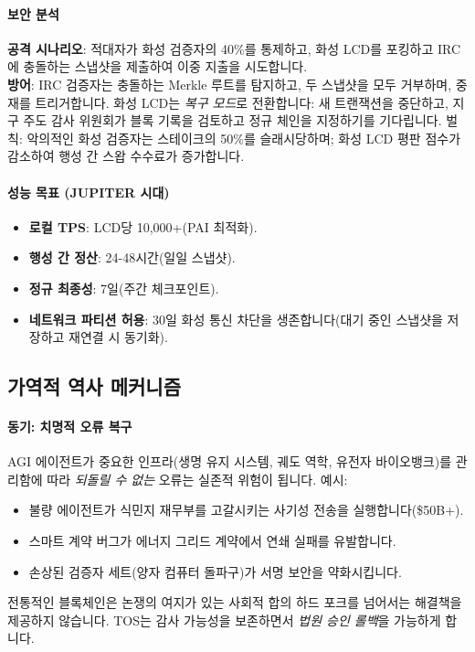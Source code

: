\documentclass[11pt]{article}
\begin{document}
\paragraph{보안 분석}
\textbf{공격 시나리오}: 적대자가 화성 검증자의 40\%를 통제하고, 화성 LCD를 포킹하고 IRC에 충돌하는 스냅샷을 제출하여 이중 지출을 시도합니다.\\
\textbf{방어}: IRC 검증자는 충돌하는 Merkle 루트를 탐지하고, 두 스냅샷을 모두 거부하며, 중재를 트리거합니다. 화성 LCD는 \emph{복구 모드}로 전환합니다: 새 트랜잭션을 중단하고, 지구 주도 감사 위원회가 블록 기록을 검토하고 정규 체인을 지정하기를 기다립니다. 벌칙: 악의적인 화성 검증자는 스테이크의 50\%를 슬래시당하며; 화성 LCD 평판 점수가 감소하여 행성 간 스왑 수수료가 증가합니다.

\paragraph{성능 목표 (JUPITER 시대)}
\begin{itemize}[noitemsep]
  \item \textbf{로컬 TPS}: LCD당 10,000+(PAI 최적화).
  \item \textbf{행성 간 정산}: 24-48시간(일일 스냅샷).
  \item \textbf{정규 최종성}: 7일(주간 체크포인트).
  \item \textbf{네트워크 파티션 허용}: 30일 화성 통신 차단을 생존합니다(대기 중인 스냅샷을 저장하고 재연결 시 동기화).
\end{itemize}

\subsection{가역적 역사 메커니즘}

\paragraph{동기: 치명적 오류 복구}
AGI 에이전트가 중요한 인프라(생명 유지 시스템, 궤도 역학, 유전자 바이오뱅크)를 관리함에 따라 \emph{되돌릴 수 없는} 오류는 실존적 위험이 됩니다. 예시:
\begin{itemize}[noitemsep]
  \item 불량 에이전트가 식민지 재무부를 고갈시키는 사기성 전송을 실행합니다(\$50B+).
  \item 스마트 계약 버그가 에너지 그리드 계약에서 연쇄 실패를 유발합니다.
  \item 손상된 검증자 세트(양자 컴퓨터 돌파구)가 서명 보안을 약화시킵니다.
\end{itemize}
전통적인 블록체인은 논쟁의 여지가 있는 사회적 합의 하드 포크를 넘어서는 해결책을 제공하지 않습니다. TOS는 감사 가능성을 보존하면서 \emph{법원 승인 롤백}을 가능하게 합니다.
\end{document}
